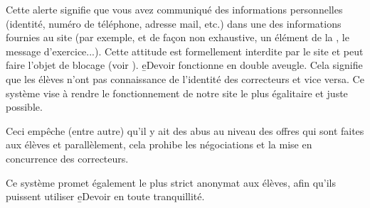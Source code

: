 ﻿Cette alerte signifie que vous avez communiqué des informations personnelles (identité, numéro de téléphone, adresse mail, etc.) dans une des informations fournies au site (par exemple, et de façon non exhaustive, un élément de la , le message d'exercice...). Cette attitude est formellement interdite par le site et peut faire l'objet de blocage (voir ).
\b{eDevoir} fonctionne en double aveugle. Cela signifie que les élèves n'ont pas connaissance de l'identité des correcteurs et vice versa. Ce système vise à rendre le fonctionnement de notre site le plus égalitaire et juste possible.
\item Ceci empêche (entre autre) qu'il y ait des abus au niveau des offres qui sont faites aux élèves et parallèlement, cela prohibe les négociations et la mise en concurrence des correcteurs.
\item Ce système promet également le plus strict anonymat aux élèves, afin qu'ils puissent utiliser \b{eDevoir} en toute tranquillité.